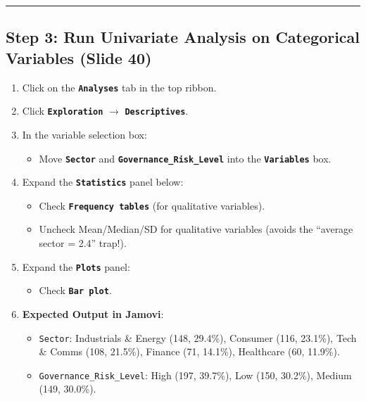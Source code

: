 \documentclass[
]{article}
\providecommand{\tightlist}{%
  \setlength{\itemsep}{0pt}\setlength{\parskip}{0pt}}
\begin{document}
\begin{center}\rule{0.5\linewidth}{0.5pt}\end{center}

\subsection{Step 3: Run Univariate Analysis on Categorical Variables
(Slide
40)}\label{step-3-run-univariate-analysis-on-categorical-variables-slide-40}

\begin{enumerate}
\def\labelenumi{\arabic{enumi}.}
\tightlist
\item
  Click on the \textbf{\texttt{Analyses}} tab in the top ribbon.
\item
  Click \textbf{\texttt{Exploration}} \(\rightarrow\)
  \textbf{\texttt{Descriptives}}.
\item
  In the variable selection box:

  \begin{itemize}
  \tightlist
  \item
    Move \textbf{\texttt{Sector}} and
    \textbf{\texttt{Governance\_Risk\_Level}} into the
    \textbf{\texttt{Variables}} box.
  \end{itemize}
\item
  Expand the \textbf{\texttt{Statistics}} panel below:

  \begin{itemize}
  \tightlist
  \item
    Check \textbf{\texttt{Frequency\ tables}} (for qualitative
    variables).
  \item
    Uncheck Mean/Median/SD for qualitative variables (avoids the
    ``average sector = 2.4'' trap!).
  \end{itemize}
\item
  Expand the \textbf{\texttt{Plots}} panel:

  \begin{itemize}
  \tightlist
  \item
    Check \textbf{\texttt{Bar\ plot}}.
  \end{itemize}
\item
  \textbf{Expected Output in Jamovi}:

  \begin{itemize}
  \tightlist
  \item
    \texttt{Sector}: Industrials \& Energy (148, 29.4\%), Consumer (116,
    23.1\%), Tech \& Comms (108, 21.5\%), Finance (71, 14.1\%),
    Healthcare (60, 11.9\%).
  \item
    \texttt{Governance\_Risk\_Level}: High (197, 39.7\%), Low (150,
    30.2\%), Medium (149, 30.0\%).
  \end{itemize}
\end{enumerate}
\end{document}
